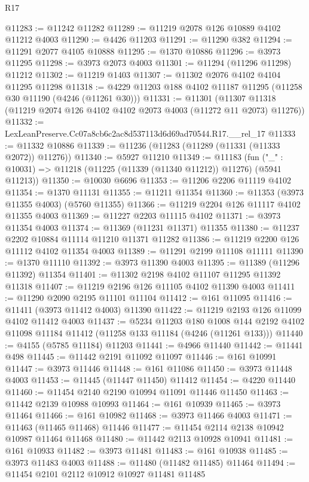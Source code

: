 \begin{lexlean}{R17}
\begin{coremodule}
@11283 := @11242 @11282
@11289 := @11219 @2078 @126 @10889 @4102 @11212 @4003
@11290 := @4426 @11203
@11291 := @11290 @382
@11294 := @11291 @2077 @4105 @10888
@11295 := @1370 @10886
@11296 := @3973 @11295
@11298 := @3973 @2073 @4003
@11301 := @11294 (@11296 @11298) @11212
@11302 := @11219 @1403
@11307 := @11302 @2076 @4102 @4104 @11295 @11298
@11318 := @4229 @11203 @188 @4102 @11187 @11295 (@11258 @30 @11190 (@4246 (@11261 @30)))
@11331 := @11301
    (@11307 @11318 (@11219 @2074 @126 @4102 @4102 @2073 @4003 (@11272 @11 @2073) @11276))
@11332 := LexLeanPreserve.Cc07a8cb6c2ac8d537113d6d69ad70544.R17.__rel_17
@11333 := @11332 @10886
@11339 := @11236 (@11283 (@11289 (@11331 (@11333 @2072)) @11276))
@11340 := @5927 @11210
@11349 := @11183
    (fun ("_" : @10031) => @11218 (@11225 (@11339 (@11340 @11212)) @11276) (@5941 @11213))
@11350 := @10030 @6696
@11353 := @11206 @2206 @11119 @4102
@11354 := @1370 @11131
@11355 := @11211 @11354
@11360 := @11353 (@3973 @11355 @4003) (@5760 @11355)
@11366 := @11219 @2204 @126 @11117 @4102 @11355 @4003
@11369 := @11227 @2203 @11115 @4102
@11371 := @3973 @11354 @4003
@11374 := @11369 (@11231 @11371) @11355
@11380 := @11237 @2202 @10884 @11114 @11210 @11371 @11282
@11386 := @11219 @2200 @126 @11112 @4102 @11354 @4003
@11389 := @11291 @2199 @11108 @11111
@11390 := @1370 @11110
@11392 := @3973 @11390 @4003
@11395 := @11389 (@11296 @11392) @11354
@11401 := @11302 @2198 @4102 @11107 @11295 @11392 @11318
@11407 := @11219 @2196 @126 @11105 @4102 @11390 @4003
@11411 := @11290 @2090 @2195 @11101 @11104
@11412 := @161 @11095
@11416 := @11411 (@3973 @11412 @4003) @11390
@11422 := @11219 @2193 @126 @11099 @4102 @11412 @4003
@11437 := @5234
    @11203
    @180
    @1008
    @144
    @2192
    @4102
    @11098
    @11184
    @11412
    (@11258 @133 @11184 (@4246 (@11261 @133)))
@11440 := @4155 (@5785 @11184) @11203
@11441 := @4966 @11440
@11442 := @11441 @498
@11445 := @11442 @2191 @11092 @11097
@11446 := @161 @10991
@11447 := @3973 @11446
@11448 := @161 @11086
@11450 := @3973 @11448 @4003
@11453 := @11445 (@11447 @11450) @11412
@11454 := @4220 @11440
@11460 := @11454 @2140 @2190 @10994 @11091 @11446 @11450
@11463 := @11442 @2139 @10988 @10993
@11464 := @161 @10939
@11465 := @3973 @11464
@11466 := @161 @10982
@11468 := @3973 @11466 @4003
@11471 := @11463 (@11465 @11468) @11446
@11477 := @11454 @2114 @2138 @10942 @10987 @11464 @11468
@11480 := @11442 @2113 @10928 @10941
@11481 := @161 @10933
@11482 := @3973 @11481
@11483 := @161 @10938
@11485 := @3973 @11483 @4003
@11488 := @11480 (@11482 @11485) @11464
@11494 := @11454 @2101 @2112 @10912 @10927 @11481 @11485

\end{coremodule}
\end{lexlean}
